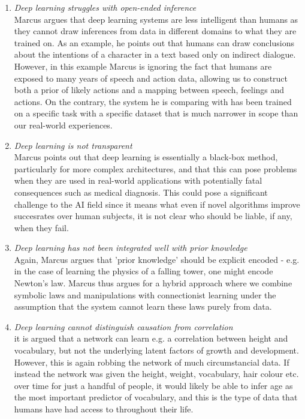 \documentclass{article}
\begin{document}
\begin{enumerate}[1]
\item \textit{Deep learning struggles with open-ended inference}\\
Marcus argues that deep learning systems are less intelligent than humans as they cannot draw inferences from data in different domains to what they are trained on. As an example, he points out that humans can draw conclusions about the intentions of a character in a text based only on indirect dialogue. However, in this example Marcus is ignoring the fact that humans are exposed to many years of speech and action data, allowing us to construct both a prior of likely actions and a mapping between speech, feelings and actions. On the contrary, the system he is comparing with has been trained on a specific task with a specific dataset that is much narrower in scope than our real-world experiences.

\item \textit{Deep learning is not transparent}\\
Marcus points out that deep learning is essentially a black-box method, particularly for more complex architectures, and that this can pose problems when they are used in real-world applications with potentially fatal consequences such as medical diagnosis. This could pose a significant challenge to the AI field since it means what even if novel algorithms improve succesrates over human subjects, it is not clear who should be liable, if any, when they fail.

\item \textit{Deep learning has not been integrated well with prior knowledge}\\
Again, Marcus argues that 'prior knowledge' should be explicit encoded - e.g. in the case of learning the physics of a falling tower, one might encode Newton's law. Marcus thus argues for a hybrid approach where we combine symbolic laws and manipulations with connectionist learning under the assumption that the system cannot learn these laws purely from data.

\item \textit{Deep learning cannot distinguish causation from correlation}\\
it is argued that a network can learn e.g. a correlation between height and vocabulary, but not the underlying latent factors of growth and development. However, this is again robbing the network of much circumstancial data. If instead the network was given the height, weight, vocabulary, hair colour etc. over time for just a handful of people, it would likely be able to infer age as the most important predictor of vocabulary, and this is the type of data that humans have had access to throughout their life.


\end{enumerate}
\end{document}
